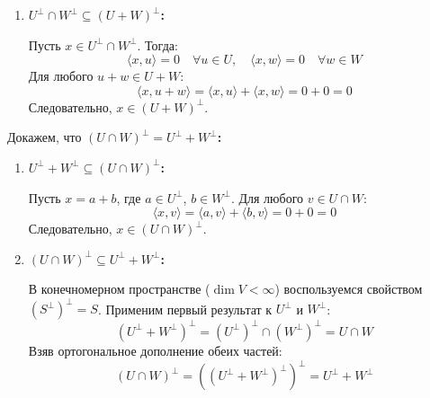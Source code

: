 \documentclass[a4paper]{article}
\begin{document}
\begin{enumerate}
\begin{enumerate}
        \item $U^\perp \cap W^\perp \subseteq (U + W)^\perp$\textbf{:}
        
        Пусть $x \in U^\perp \cap W^\perp$. Тогда:
        \[
        \langle x, u \rangle = 0 \quad \forall u \in U, \quad \langle x, w \rangle = 0 \quad \forall w \in W
        \]
        Для любого $u + w \in U + W$:
        \[
        \langle x, u + w \rangle = \langle x, u \rangle + \langle x, w \rangle = 0 + 0 = 0
        \]
        Следовательно, $x \in (U + W)^\perp$.
    \end{enumerate}

    Докажем, что $(U \cap W)^\perp = U^\perp + W^\perp$\textbf{:}

    \begin{enumerate}
        \item $U^\perp + W^\perp \subseteq (U \cap W)^\perp$\textbf{:}
        
        Пусть $x = a + b$, где $a \in U^\perp$, $b \in W^\perp$. Для любого $v \in U \cap W$:
        \[
        \langle x, v \rangle = \langle a, v \rangle + \langle b, v \rangle = 0 + 0 = 0
        \]
        Следовательно, $x \in (U \cap W)^\perp$.

        \item$(U \cap W)^\perp \subseteq U^\perp + W^\perp$\textbf{:}
        
        В конечномерном пространстве ($\dim V < \infty$) воспользуемся свойством $(S^\perp)^\perp = S$. Применим первый результат к $U^\perp$ и $W^\perp$:
        \[
        (U^\perp + W^\perp)^\perp = (U^\perp)^\perp \cap (W^\perp)^\perp = U \cap W
        \]
        Взяв ортогональное дополнение обеих частей:
        \[
        (U \cap W)^\perp = \left((U^\perp + W^\perp)^\perp\right)^\perp = U^\perp + W^\perp
        \]
    \end{enumerate}
\end{enumerate}
\end{document}

